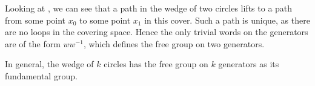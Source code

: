 Looking at , we can see that a path in the wedge of two circles lifts to a path from some point $x_0$ to some point $x_1$ in this cover.  Such a path is unique, as there are no loops in the covering space.  Hence the only trivial words on the generators are of the form $ww^{-1}$, which defines the free group on two generators.

In general, the wedge of $k$ circles has the free group on $k$ generators as its fundamental group.

